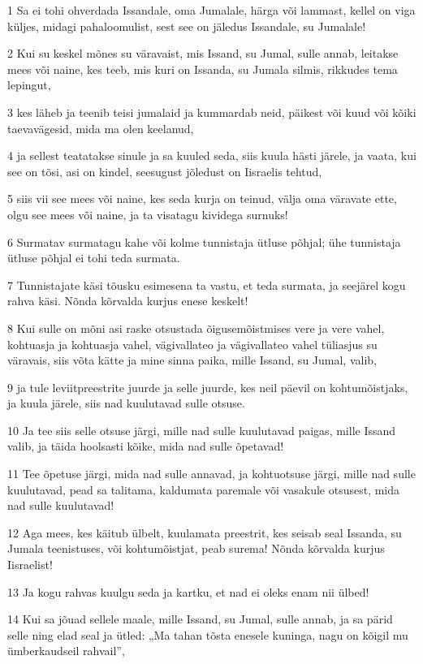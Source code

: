 \par 1 Sa ei tohi ohverdada Issandale, oma Jumalale, härga või lammast, kellel on viga küljes, midagi pahaloomulist, sest see on jäledus Issandale, su Jumalale!
\par 2 Kui su keskel mõnes su väravaist, mis Issand, su Jumal, sulle annab, leitakse mees või naine, kes teeb, mis kuri on Issanda, su Jumala silmis, rikkudes tema lepingut,
\par 3 kes läheb ja teenib teisi jumalaid ja kummardab neid, päikest või kuud või kõiki taevavägesid, mida ma olen keelanud,
\par 4 ja sellest teatatakse sinule ja sa kuuled seda, siis kuula hästi järele, ja vaata, kui see on tõsi, asi on kindel, seesugust jõledust on Iisraelis tehtud,
\par 5 siis vii see mees või naine, kes seda kurja on teinud, välja oma väravate ette, olgu see mees või naine, ja ta visatagu kividega surnuks!
\par 6 Surmatav surmatagu kahe või kolme tunnistaja ütluse põhjal; ühe tunnistaja ütluse põhjal ei tohi teda surmata.
\par 7 Tunnistajate käsi tõusku esimesena ta vastu, et teda surmata, ja seejärel kogu rahva käsi. Nõnda kõrvalda kurjus enese keskelt!
\par 8 Kui sulle on mõni asi raske otsustada õigusemõistmises vere ja vere vahel, kohtuasja ja kohtuasja vahel, vägivallateo ja vägivallateo vahel tüliasjus su väravais, siis võta kätte ja mine sinna paika, mille Issand, su Jumal, valib,
\par 9 ja tule leviitpreestrite juurde ja selle juurde, kes neil päevil on kohtumõistjaks, ja kuula järele, siis nad kuulutavad sulle otsuse.
\par 10 Ja tee siis selle otsuse järgi, mille nad sulle kuulutavad paigas, mille Issand valib, ja täida hoolsasti kõike, mida nad sulle õpetavad!
\par 11 Tee õpetuse järgi, mida nad sulle annavad, ja kohtuotsuse järgi, mille nad sulle kuulutavad, pead sa talitama, kaldumata paremale või vasakule otsusest, mida nad sulle kuulutavad!
\par 12 Aga mees, kes käitub ülbelt, kuulamata preestrit, kes seisab seal Issanda, su Jumala teenistuses, või kohtumõistjat, peab surema! Nõnda kõrvalda kurjus Iisraelist!
\par 13 Ja kogu rahvas kuulgu seda ja kartku, et nad ei oleks enam nii ülbed!
\par 14 Kui sa jõuad sellele maale, mille Issand, su Jumal, sulle annab, ja sa pärid selle ning elad seal ja ütled: „Ma tahan tõsta enesele kuninga, nagu on kõigil mu ümberkaudseil rahvail”,
